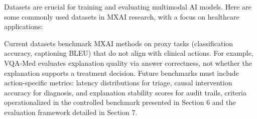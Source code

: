 \documentclass[pdflatex,sn-mathphys-num]{sn-jnl}%
\theoremstyle{thmstyleone}%
\theoremstyle{thmstyletwo}%
\theoremstyle{thmstylethree}%
\begin{document}
\begin{itemize}
Datasets are crucial for training and evaluating multimodal AI models. Here are some commonly used datasets in MXAI research,  with a focus on healthcare applications:

Current datasets benchmark MXAI methods on proxy tasks (classification accuracy, captioning BLEU) that do not align with clinical actions. For example, VQA-Med evaluates explanation quality via answer correctness, not whether the explanation supports a treatment decision.\newline 
Future benchmarks must include action-specific metrics: latency distributions for triage, causal intervention accuracy for diagnosis, and explanation stability scores for audit trails, criteria operationalized in the controlled benchmark presented in Section 6 and the evaluation framework detailed in Section 7.



\end{itemize}
\end{document}

